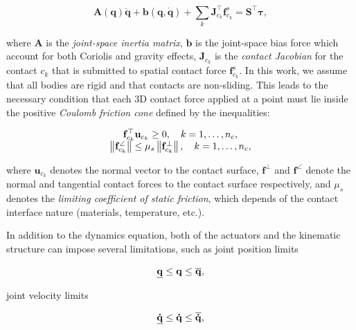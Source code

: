 \begin{equation}
\label{dynamics-equation}
\mathbf{A}(\mathbf{q})\ddot{\mathbf{q}}
+\mathbf{b}(\mathbf{q},\dot{\mathbf{q}})
+\sum_k\mathbf{J}_{c_k}^\top\mathbf{f}^s_{c_k} =
\mathbf{S}^\top\boldsymbol{\tau},
\end{equation}

\noindent where $\mathbf{A}$ is the \emph{joint-space inertia matrix},
$\mathbf{b}$ is the joint-space bias force which account for both
Coriolis and gravity effects, $\mathbf{J}_{c_k}$ is the \emph{contact
  Jacobian} for the contact $c_k$ that is submitted to spatial contact
force $\mathbf{f}^s_{c_k}$. In this work, we assume that all bodies
are rigid and that contacts are non-sliding. This leads to the
necessary condition that each 3D contact force applied at a point must
lie inside the positive \emph{Coulomb friction cone}
\cite{trinkle1997dynamic} defined by the inequalities:

\begin{equation}
  \label{eq:chap3-friction-cone}
  \begin{array}{c}
    \mathbf{f}_{c_k}^{\top}\mathbf{u}_{c_k} \ge 0, \quad k=1,\dots,n_c, \\
    \left\lVert \mathbf{f}_{c_k}^\angle \right\rVert \le
    \mu_s\left\lVert \mathbf{f}_{c_k}^\bot \right\rVert, \quad k=1,\dots,n_c,
  \end{array}
\end{equation}

\noindent where $\mathbf{u}_{c_k}$ denotes the normal vector to the contact
surface, $\mathbf{f}^\bot$ and $\mathbf{f}^\angle$ denote the normal
and tangential contact forces to the contact surface respectively, and
$\mu_s$ denotes the \emph{limiting coefficient of static friction},
which depends of the contact interface nature (materials, temperature,
etc.).

In addition to the dynamics equation, both of the actuators and the
kinematic structure can impose several limitations, such as joint
position limits

\begin{equation}
  \underline{\mathbf{q}} \le \mathbf{q} \le \overline{\mathbf{q}},
\end{equation}

\noindent joint velocity limits

\begin{equation}
  \underline{\mathbf{\dot{q}}} \le \mathbf{\dot{q}} \le
  \overline{\mathbf{\dot{q}}},
\end{equation}

